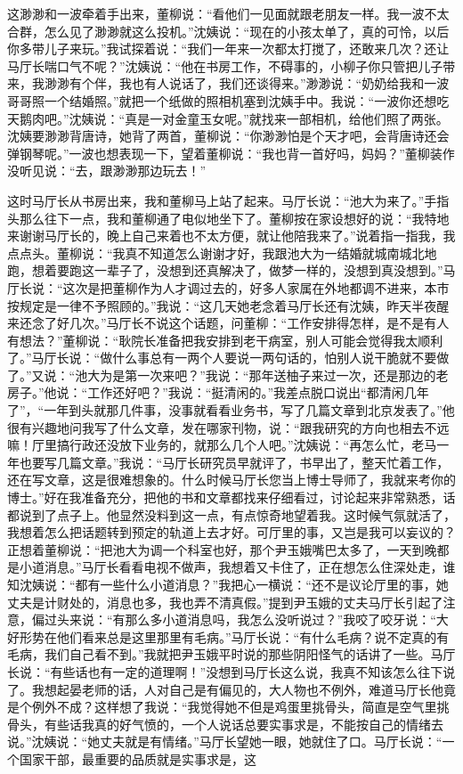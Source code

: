 \documentclass[12pt,oneside]{book}
\begin{document}
这渺渺和一波牵着手出来，董柳说：``看他们一见面就跟老朋友一样。我一波不太合群，怎么见了渺渺就这么投机。''沈姨说：``现在的小孩太单了，真的可怜，以后你多带儿子来玩。''我试探着说：``我们一年来一次都太打搅了，还敢来几次？还让马厅长喘口气不呢？''沈姨说：``他在书房工作，不碍事的，小柳子你只管把儿子带来，我渺渺有个伴，我也有人说话了，我们还谈得来。''渺渺说：``奶奶给我和一波哥哥照一个结婚照。''就把一个纸做的照相机塞到沈姨手中。我说：``一波你还想吃天鹅肉吧。''沈姨说：``真是一对金童玉女呢。''就找来一部相机，给他们照了两张。沈姨要渺渺背唐诗，她背了两首，董柳说：``你渺渺怕是个天才吧，会背唐诗还会弹钢琴呢。''一波也想表现一下，望着董柳说：``我也背一首好吗，妈妈？''董柳装作没听见说：``去，跟渺渺那边玩去！''

这时马厅长从书房出来，我和董柳马上站了起来。马厅长说：``池大为来了。''手指头那么往下一点，我和董柳通了电似地坐下了。董柳按在家设想好的说：``我特地来谢谢马厅长的，晚上自己来着也不太方便，就让他陪我来了。''说着指一指我，我点点头。董柳说：``我真不知道怎么谢谢才好，我跟池大为一结婚就城南城北地跑，想着要跑这一辈子了，没想到还真解决了，做梦一样的，没想到真没想到。''马厅长说：``这次是把董柳作为人才调过去的，好多人家属在外地都调不进来，本市按规定是一律不予照顾的。''我说：``这几天她老念着马厅长还有沈姨，昨天半夜醒来还念了好几次。''马厅长不说这个话题，问董柳：``工作安排得怎样，是不是有人有想法？''董柳说：``耿院长准备把我安排到老干病室，别人可能会觉得我太顺利了。''马厅长说：``做什么事总有一两个人要说一两句话的，怕别人说干脆就不要做了。''又说：``池大为是第一次来吧？''我说：``那年送柚子来过一次，还是那边的老房子。''他说：``工作还好吧？''我说：``挺清闲的。''我差点脱口说出``都清闲几年了''，``一年到头就那几件事，没事就看看业务书，写了几篇文章到北京发表了。''他很有兴趣地问我写了什么文章，发在哪家刊物，说：``跟我研究的方向也相去不远嘛！厅里搞行政还没放下业务的，就那么几个人吧。''沈姨说：``再怎么忙，老马一年也要写几篇文章。''我说：``马厅长研究员早就评了，书早出了，整天忙着工作，还在写文章，这是很难想象的。什么时候马厅长您当上博士导师了，我就来考你的博士。''好在我准备充分，把他的书和文章都找来仔细看过，讨论起来非常熟悉，话都说到了点子上。他显然没料到这一点，有点惊奇地望着我。这时候气氛就活了，我想着怎么把话题转到预定的轨道上去才好。可厅里的事，又岂是我可以妄议的？正想着董柳说：``把池大为调一个科室也好，那个尹玉娥嘴巴太多了，一天到晚都是小道消息。''马厅长看看电视不做声，我想着又卡住了，正在想怎么住深处走，谁知沈姨说：``都有一些什么小道消息？''我把心一横说：``还不是议论厅里的事，她丈夫是计财处的，消息也多，我也弄不清真假。''提到尹玉娥的丈夫马厅长引起了注意，偏过头来说：``有那么多小道消息吗，我怎么没听说过？''我咬了咬牙说：``大好形势在他们看来总是这里那里有毛病。''马厅长说：``有什么毛病？说不定真的有毛病，我们自己看不到。''我就把尹玉娥平时说的那些阴阳怪气的话讲了一些。马厅长说：``有些话也有一定的道理啊！''没想到马厅长这么说，我真不知该怎么往下说了。我想起晏老师的话，人对自己是有偏见的，大人物也不例外，难道马厅长他竟是个例外不成？这样想了我说：``我觉得她不但是鸡蛋里挑骨头，简直是空气里挑骨头，有些话我真的好气愤的，一个人说话总要实事求是，不能按自己的情绪去说。''沈姨说：``她丈夫就是有情绪。''马厅长望她一眼，她就住了口。马厅长说：``一个国家干部，最重要的品质就是实事求是，这
\end{document}
